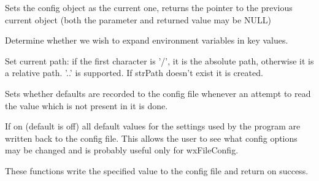 \label{wxconfigbaseset}


Sets the config object as the current one, returns the pointer to the previous
current object (both the parameter and returned value may be NULL)


\label{wxconfigbasesetexpandenvvars}


Determine whether we wish to expand environment variables in key values.


\label{wxconfigbasesetpath}


Set current path: if the first character is '/', it is the absolute path,
otherwise it is a relative path. '..' is supported. If strPath doesn't
exist it is created.


\label{wxconfigbasesetrecorddefaults}


Sets whether defaults are recorded to the config file whenever an attempt to
read the value which is not present in it is done.

If on (default is off) all default values for the settings used by the program
are written back to the config file. This allows the user to see what config
options may be changed and is probably useful only for wxFileConfig.


\label{wxconfigbasewrite}





These functions write the specified value to the config file and return \true on success.



